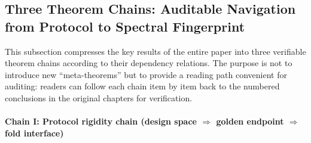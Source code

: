\subsection{Three Theorem Chains: Auditable Navigation from Protocol to Spectral Fingerprint}\label{subsec:three-theorem-chains-rewrite-skeleton}

This subsection compresses the key results of the entire paper into three verifiable theorem chains according to their dependency relations. The purpose is not to introduce new ``meta-theorems'' but to provide a reading path convenient for auditing: readers can follow each chain item by item back to the numbered conclusions in the original chapters for verification.

\paragraph{Chain I: Protocol rigidity chain (design space \texorpdfstring{$\Rightarrow$}{=>} golden endpoint \texorpdfstring{$\Rightarrow$}{=>} fold interface)}
